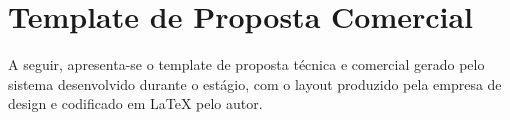 
\chapter{Template de Proposta Comercial}
\label{anx:anexo-a}

A seguir, apresenta-se o template de proposta técnica e comercial gerado pelo sistema desenvolvido
durante o estágio, com o layout produzido pela empresa de design e codificado em \LaTeX{} pelo autor.

